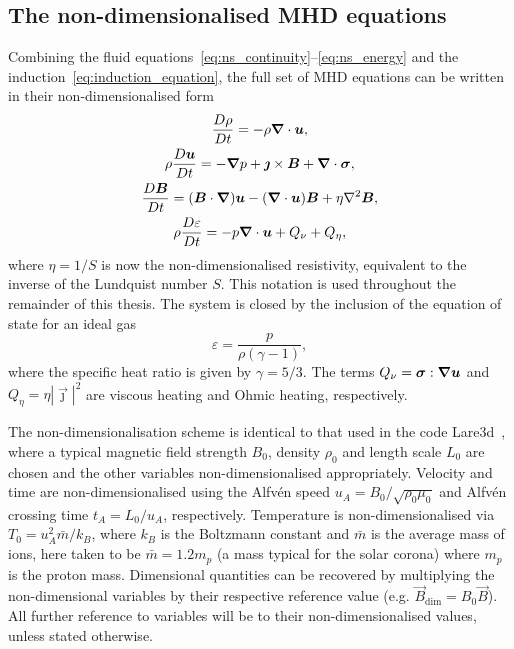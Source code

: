 \subsection{The non-dimensionalised MHD equations}

\label{sec:mhd_equations}

Combining the fluid equations~\eqref{eq:ns_continuity}--\eqref{eq:ns_energy} and the induction~\eqref{eq:induction_equation}, the full set of MHD equations can be written in their non-dimensionalised form
\begin{gather}
\label{eq:mhda}
\frac{D\rho}{Dt} = - \rho \vec{\nabla} \cdot \vec{u},\\
\rho\frac{D\vec{u}}{Dt} = -\vec{\nabla} p + \vec{\jmath} \times \vec{B} + \vec{\nabla} \cdot \ten{\sigma},\\
\frac{D\vec{B}}{Dt} = (\vec{B} \cdot \vec{\nabla})\vec{u} - (\vec{\nabla} \cdot \vec{u})\vec{B} + \eta \nabla^2 \vec{B},\\
\rho\frac{D\varepsilon}{Dt} = -p \vec{\nabla} \cdot \vec{u} + {Q}_{\nu} + {Q}_{\eta},%
\label{eq:energy}
\end{gather}
where $\eta = 1/S$ is now the non-dimensionalised resistivity, equivalent
to the inverse of the Lundquist number $S$. This notation is used throughout the remainder of this thesis. The system is closed by the inclusion of the equation of state for an ideal gas
\begin{equation}
\varepsilon = \frac{p}{\rho(\gamma - 1)},
\end{equation}
where the specific heat ratio is given by $\gamma = 5/3$. The
  terms ${Q}_{\nu} = {\bm \sigma} : {\bm \nabla}{\bm u}$ and
  ${Q}_{\eta} = \eta | \vec{\jmath} |^2$ are viscous heating and Ohmic heating, respectively.

The non-dimensionalisation scheme is identical to that used in the code Lare3d~\cite{arberStaggeredGridLagrangian2001}, where a typical magnetic field strength $B_0$, density $\rho_0$ and length scale $L_0$ are chosen and the other variables non-dimensionalised appropriately. Velocity and time are
non-dimensionalised using the Alfv\'en speed $u_A = B_0 / \sqrt{\rho_0
  \mu_0}$ and Alfv\'en crossing time $t_A = L_0/u_A$,
respectively. Temperature is non-dimensionalised via $T_0 = u_A^2
\bar{m} / k_B$, where $k_B$ is the Boltzmann constant and $\bar{m}$ is
the average mass of ions, here taken to be $\bar{m} = 1.2m_p$ (a mass
typical for the solar corona) where $m_p$ is the proton mass. Dimensional quantities can be recovered by multiplying the non-dimensional variables by their respective reference value (e.g. $\vec{B}_{\dim} = B_0 \vec{B}$). All further reference to variables will be to their non-dimensionalised values, unless stated otherwise.

